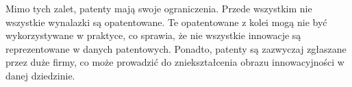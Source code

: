 Mimo tych zalet, patenty mają swoje ograniczenia. Przede wszystkim
nie wszystkie wynalazki są opatentowane. Te opatentowane z kolei
mogą nie być wykorzystywane w praktyce, co sprawia, że nie
wszystkie innowacje są reprezentowane w danych patentowych.
Ponadto, patenty są zazwyczaj zgłaszane przez duże firmy, co
może prowadzić do zniekształcenia obrazu innowacyjności w
danej dziedzinie.

\begin{acronym}
\end{acronym}